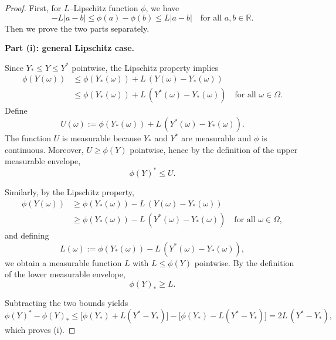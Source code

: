 \documentclass[12pt]{article}
\renewcommand{\(}{\left(}%
\renewcommand{\)}{\right)}%
\renewcommand{\[}{\left[}%
\renewcommand{\]}{\right]}%
\newtheorem{proof}{Proof.}}
\begin{document}
\begin{proof}
First, for $L$--Lipschitz function $\phi$, we have
\begin{equation*}
	-L|a-b|\leq \phi(a)-\phi(b)\leq L|a-b|\quad \text{for all } a,b\in\mathbb{R}.
\end{equation*}
Then we prove the two parts separately.

\medskip
\noindent
\textbf{Part (i): general Lipschitz case.}

Since $Y_*\le Y \le Y^*$ pointwise, the Lipschitz property implies
\begin{equation*}
\begin{split}
	\phi(Y(\omega))&\leq \phi(Y_*(\omega)) + L\,(Y(\omega)-Y_*(\omega))\\
&\le
\phi(Y_*(\omega)) + L\,(Y^*(\omega)-Y_*(\omega))
\quad \text{for all } \omega\in\Omega.
\end{split}
\end{equation*}
Define
\begin{equation*}
U(\omega)
:=
\phi(Y_*(\omega)) + L\,(Y^*(\omega)-Y_*(\omega)).
\end{equation*}
The function $U$ is measurable because $Y_*$ and $Y^*$ are measurable and $\phi$ is continuous.
Moreover, $U \ge \phi(Y)$ pointwise, hence by the definition of the upper measurable envelope,
\begin{equation*}
\phi(Y)^* \le U.
\end{equation*}

Similarly, by the Lipschitz property,
\begin{equation*}
\begin{split}
	\phi(Y(\omega))&\ge
\phi(Y_*(\omega)) - L\,(Y(\omega)-Y_*(\omega))\\
&\ge
\phi(Y_*(\omega)) - L\,(Y^*(\omega)-Y_*(\omega))\quad \text{for all } \omega\in\Omega,
\end{split}
\end{equation*}
and defining
\begin{equation*}
L(\omega)
:=
\phi(Y_*(\omega)) - L\,(Y^*(\omega)-Y_*(\omega)),
\end{equation*}
we obtain a measurable function $L$ with $L\le \phi(Y)$ pointwise.
By the definition of the lower measurable envelope,
\begin{equation*}
\phi(Y)_* \ge L.
\end{equation*}

Subtracting the two bounds yields
\begin{equation*}
\phi(Y)^* - \phi(Y)_*
\le
\bigl[\phi(Y_*) + L(Y^*-Y_*)\bigr]
-
\bigl[\phi(Y_*) - L(Y^*-Y_*)\bigr]
=
2L\,(Y^*-Y_*),
\end{equation*}
which proves (i).


\end{proof}
\end{document}

